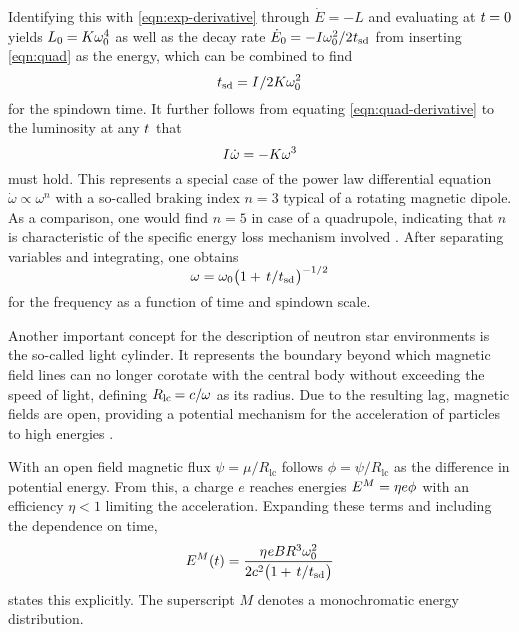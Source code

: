 \newpage

Identifying this with \eqref{eqn:exp-derivative} through $\dot{E} = -L$ and evaluating at $t \kern-0.3pt= 0$ yields
$L_0 \kern-0.3pt = \kern-0.2pt K \omega_0^4$ as well as the decay rate $\dot{E}_0 \kern-0.3pt = -I \omega_0^2 / 2 \kern+0.4pt t_\text{sd}$
from inserting \eqref{eqn:quad} as the energy, which can be combined to find
\begin{equation*}
	t_\text{sd} = I \kern+0.5pt / 2K\omega_0^2
	\label{eqn:spindown-time}
\end{equation*}
for the spindown time. It further follows from equating \eqref{eqn:quad-derivative} to the luminosity at any $t \kern+0.5pt$ that
\begin{equation*}
	I \kern+0.5pt \dot{\omega} = -K \omega^3
\end{equation*}
must hold. This represents a special case of the power law differential equation $\dot{\omega} \propto \omega^n$ with a so-called
braking index $n = 3$ typical of a rotating magnetic dipole. As a comparison, one would find $n = 5$ in case of a quadrupole, indicating
that $n$ is characteristic of the specific energy loss mechanism involved \cite{Alvarez_2004}. After separating variables and integrating,
one obtains
\begin{equation*}
	\omega = \omega_0 \smash{\bigl( 1 + \kern+1.5pt t \kern+0.1pt / \kern+0.2pt t_\text{sd} \kern+0.5pt \bigr)^{-1/2}}
	\label{eqn:frequency}
\end{equation*}
for the frequency as a function of time and spindown scale.

Another important concept for the description of neutron star environments is the so-called light cylinder. It represents the boundary
beyond which magnetic field lines can no longer corotate with the central body without exceeding the speed of light, defining
$R_\text{lc} \kern-0.6pt = c / \kern-0.4pt \omega$ as its radius. Due to the resulting lag, magnetic fields
are open, providing a potential mechanism for the acceleration of particles to high energies \cite{Goldreich_1969}.

With an open field magnetic flux $\psi = \mu / R_\text{lc}$ follows $\phi = \psi / R_\text{lc}$ as the difference in potential energy.
From this, a charge $e$ reaches energies $E^M = \eta e \phi \kern+0.5pt$ with an efficiency $\eta < 1$ limiting the acceleration.
Expanding these terms and including the dependence on time,
\begin{equation}
	E^M(t) = \frac{\eta \kern+0.5pt e B R^3 \omega_0^2}{2c^2 \bigl( 1 + \kern+1.5pt t \kern+0.1pt / \kern+0.2pt t_\text{sd} \kern+0.5pt \bigr)}
	\label{eqn:mono}
\end{equation}
states this explicitly. The superscript $M$ denotes a monochromatic energy distribution.



